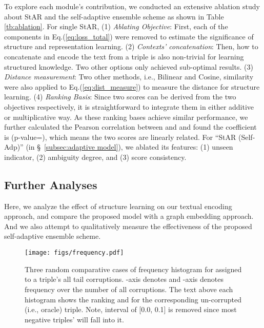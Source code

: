 \documentclass[sigconf]{acmart}
\begin{document}
To explore each module's contribution, we conducted an extensive ablation study about StAR and the self-adaptive ensemble scheme as shown in Table \ref{tb:ablation}. 
For single StAR, 
(1) \emph{Ablating Objective}: First, each of the components in Eq.(\ref{eq:loss_total}) were removed to estimate the significance of structure and representation learning. 
(2) \emph{Contexts' concatenation}: 
Then, how to concatenate and encode the text from a triple is also non-trivial for learning structured knowledge. Two other options only achieved sub-optimal results. 
(3) \emph{Distance measurement}: Two other methods, i.e., Bilinear and Cosine, similarity were also applied to Eq.(\ref{eq:dist_measure}) to measure the distance for structure learning. 
(4) \emph{Ranking Basis}: Since two scores can be derived from the two objectives respectively, it is straightforward to integrate them in either additive or multiplicative way. As these ranking bases achieve similar performance, we further calculated the Pearson correlation between  and  and found the coefficient is  (p-value=), which means the two scores are linearly related. For ``StAR (Self-Adp)'' (in \S~\ref{subsec:adaptive model}), we ablated its features: (1) unseen indicator, (2) ambiguity degree, and (3) score consistency. 


\subsection{Further Analyses} \label{subsec:further_analyses}
Here, we analyze the effect of structure learning on our textual encoding approach, and compare the proposed model with a graph embedding approach. 
And we also attempt to qualitatively measure the effectiveness of the proposed self-adaptive ensemble scheme. 



\begin{figure}[t] \centering
    \texttt{[image: figs/frequency.pdf]}
	\caption{\small Three random comparative cases of frequency histogram for  assigned to a triple's all tail corruptions. -axis denotes  and -axis denotes frequency over the number of all corruptions. 
	The text above each histogram shows the ranking and  for the corresponding un-corrupted (i.e., oracle) triple. 
	Note, interval of [0.0, 0.1] is removed since most negative triples'  will fall into it. 
	} 
	\label{fig:freq} 
\end{figure} 
\end{document}
